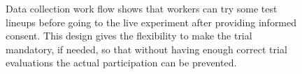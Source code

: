 \documentclass[11pt]{article}
\begin{document}
\begin{figure}[hbtp]
   \centering
       \caption{Data collection work flow shows that workers can try some test lineups before going to the live experiment after providing informed consent. This design gives the flexibility to make the trial mandatory, if needed, so that without having enough correct trial evaluations the actual participation can be prevented.}
       \label{fig:turk_data_flow}
\end{figure}




\end{document}
